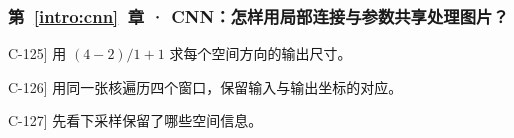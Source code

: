 \subsubsection*{第~\ref*{intro:cnn}~章 · CNN：怎样用局部连接与参数共享处理图片？}
\begin{answerhints}
\item[\hyperref[exercise:convolution-output-shape]{C-125}] \leavevmode{}\label{hint:convolution-output-shape}用 $(4-2)/1+1$ 求每个空间方向的输出尺寸。
\item[\hyperref[exercise:convolution-shared-kernel]{C-126}] \leavevmode{}\label{hint:convolution-shared-kernel}用同一张核遍历四个窗口，保留输入与输出坐标的对应。
\item[\hyperref[exercise:pooling-detail-loss]{C-127}] \leavevmode{}\label{hint:pooling-detail-loss}先看下采样保留了哪些空间信息。
\end{answerhints}
